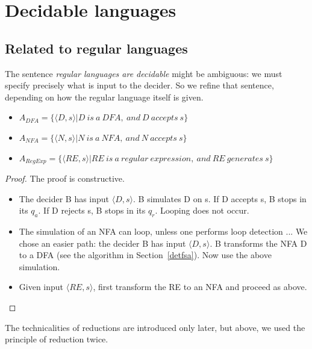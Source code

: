 \section{Decidable languages}

\subsection{Related to regular languages}

The sentence {\em regular languages are decidable} might be ambiguous:
we must specify precisely what is input to the decider. So we refine
that sentence, depending on how the regular language itself is given.


\begin{itemize}
\item
$A_{DFA} = \{\langle D,s \rangle|D~is~a~DFA,~and~D~accepts~s\}$
\item 
$A_{NFA} = \{\langle N,s \rangle|N~is~a~NFA,~and~N~accepts~s\}$
\item 
$A_{RegExp} = \{\langle RE,s
  \rangle|RE~is~a~regular~expression,~and~RE~generates~s\}$
\end{itemize}


\begin{proof} The proof is constructive.
\begin{itemize}
\item 
The decider B has input $\langle D,s \rangle$. B simulates D on s. If
D accepts s, B stops in its $q_a$. If D rejects s, B stops in its
$q_r$. Looping does not occur.

\item 
The simulation of an NFA can loop, unless one performs loop detection
... We chose an easier path: the decider B has input $\langle D,s
\rangle$. B transforms the NFA D to a DFA (see the algorithm in
Section~\ref{detfsa}). Now use the above simulation.

\item
Given input $\langle RE,s \rangle$, first transform the RE to an NFA
and proceed as above.
\end{itemize}
\end{proof}

The technicalities of reductions are introduced only later, but
above, we used the principle of reduction twice.

